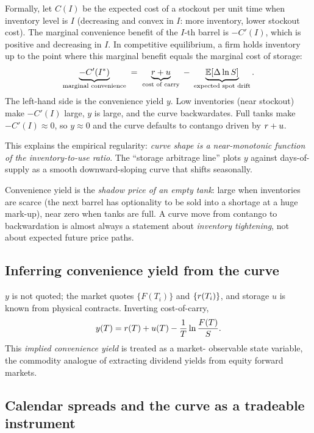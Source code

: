 Formally, let $C(I)$ be the expected cost of a stockout per unit
time when inventory level is $I$ (decreasing and convex in $I$:
more inventory, lower stockout cost).  The marginal convenience
benefit of the $I$-th barrel is $-C'(I)$, which is positive and
decreasing in $I$.  In competitive equilibrium, a firm holds
inventory up to the point where this marginal benefit equals the
marginal cost of storage:
\[
  \underbrace{-C'(I^*)}_{\text{marginal convenience}}
    \;=\; \underbrace{r + u}_{\text{cost of carry}}
    \;-\; \underbrace{\mathbb{E}[\Delta \ln S]}_{\text{expected spot drift}}.
\]
The left-hand side is the convenience yield $y$.  Low inventories
(near stockout) make $-C'(I)$ large, $y$ is large, and the curve
backwardates.  Full tanks make $-C'(I) \approx 0$, so $y \approx 0$
and the curve defaults to contango driven by $r + u$.

This explains the empirical regularity: \emph{curve shape is a
near-monotonic function of the inventory-to-use ratio}.  The
``storage arbitrage line'' plots $y$ against days-of-supply as a
smooth downward-sloping curve that shifts seasonally.

\begin{intuitionbox}
Convenience yield is the \emph{shadow price of an empty tank}:
large when inventories are scarce (the next barrel has optionality
to be sold into a shortage at a huge mark-up), near zero when tanks
are full.  A curve move from contango to backwardation is almost
always a statement about \emph{inventory tightening}, not about
expected future price paths.
\end{intuitionbox}

\subsection{Inferring convenience yield from the curve}

$y$ is not quoted; the market quotes $\{F(T_i)\}$ and
$\{r(T_i)\}$, and storage $u$ is known from physical contracts.
Inverting cost-of-carry,
\[
  y(T) = r(T) + u(T) - \frac{1}{T} \ln\frac{F(T)}{S}.
\]
This \emph{implied convenience yield} is treated as a market-
observable state variable, the commodity analogue of extracting
dividend yields from equity forward markets.

\subsection{Calendar spreads and the curve as a tradeable instrument}
\label{subsec:calendar_spreads}


